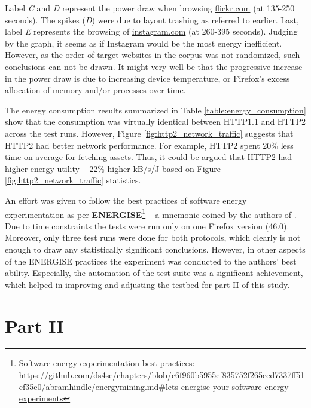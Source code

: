 \documentclass{article}
\begin{document}
Label \emph{C} and \emph{D} represent the power draw when browsing \url{flickr.com} (at 135-250 seconds). The spikes (\emph{D}) were due to layout trashing as referred to earlier. Last, label \emph{E} represents the browsing of \url{instagram.com} (at 260-395 seconds). Judging by the graph, it seems as if Instagram would be the most energy inefficient. However, as the order of target websites in the corpus was not randomized, such conclusions can not be drawn. It might very well be that the progressive increase in the power draw is due to increasing device temperature, or Firefox's excess allocation of memory and/or processes over time.

The energy consumption results summarized in Table \ref{table:energy_consumption} show that the consumption was virtually identical between HTTP1.1 and HTTP2 across the test runs. However, Figure \ref{fig:http2_network_traffic} suggests that HTTP2 had better network performance. For example, HTTP2 spent 20\% less time on average for fetching assets. Thus, it could be argued that HTTP2 had higher energy utility -- 22\% higher kB/s/J based on Figure \ref{fig:http2_network_traffic} statistics.

An effort was given to follow the best practices of software energy experimentation as per \textbf{ENERGISE}\footnote{Software energy experimentation best practices: \url{https://github.com/ds4se/chapters/blob/c6f960b5955ef835752f265eed7337ff51cf35e0/abramhindle/energymining.md\#lets-energise-your-software-energy-experiments}} -- a mnemonic coined by the authors of \cite{greenminer}. Due to time constraints the tests were run only on one Firefox version (46.0). Moreover, only three test runs were done for both protocols, which clearly is not enough to draw any statistically significant conclusions. However, in other aspects of the ENERGISE practices the experiment was conducted to the authors' best ability. Especially, the automation of the test suite was a significant achievement, which helped in improving and adjusting the testbed for part II of this study.

\section{Part II}
\end{document}
